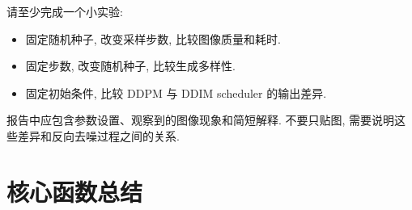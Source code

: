 \documentclass{../../nndlcourse}
\begin{document}
请至少完成一个小实验:
\begin{itemize}
    \item 固定随机种子, 改变采样步数, 比较图像质量和耗时.
    \item 固定步数, 改变随机种子, 比较生成多样性.
    \item 固定初始条件, 比较 DDPM 与 DDIM scheduler 的输出差异.
\end{itemize}
报告中应包含参数设置、观察到的图像现象和简短解释. 不要只贴图, 需要说明这些差异和反向去噪过程之间的关系.


\section{核心函数总结}
\end{document}
